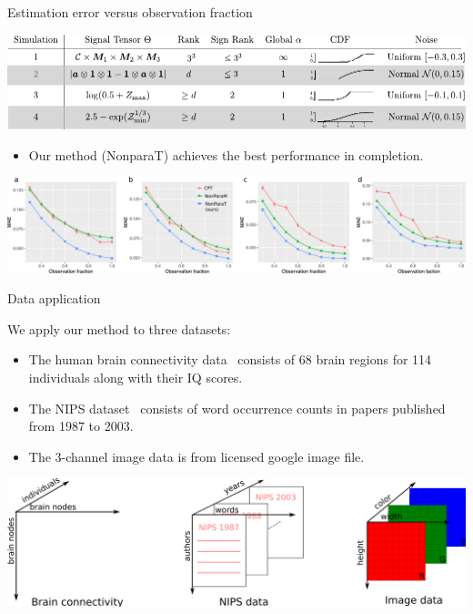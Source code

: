 \documentclass[10pt, mathserif]{beamer} %
\theoremstyle{definition}
\theoremstyle{plain}
\begin{document}
\begin{frame}{Estimation error versus observation fraction}

    \begin{center}
        \includegraphics[width = \textwidth]{Figures/simulation_new.pdf}
        \end{center}
        
  \begin{itemize}
    \item Our method (NonparaT) achieves the best performance in completion. 
  \end{itemize}
    
    \begin{center}
  \includegraphics[width =\textwidth]{Figures/fig5-8v2.pdf}
  \end{center}
    
\end{frame}


\begin{frame}{Data application}

We apply our method to three datasets:
\begin{itemize}
\item The human brain connectivity data~\citep{wang2017bayesian} consists of 68 brain regions for 114 individuals along with their IQ scores.

\item The NIPS dataset~\citep{globerson2007euclidean} consists of word occurrence counts in papers published from 1987 to 2003.
\item The 3-channel image data is from licensed google image file.


\end{itemize}
    \begin{center}
    \includegraphics[width =\textwidth]{Figures/ndataset.pdf}
    \end{center}
\end{frame}
\end{document}
